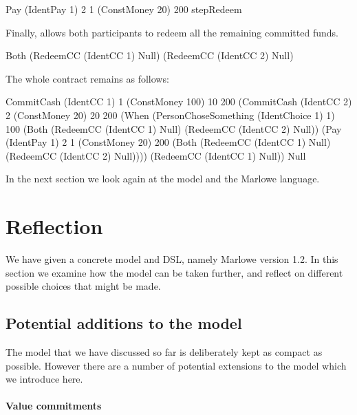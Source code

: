 \documentclass[
      acmsmall
    , screen
    , review=true
  ]{acmart}
\begin{document}
\begin{haskellcode}
Pay (IdentPay 1) 2 1 (ConstMoney 20) 200 stepRedeem
\end{haskellcode}

Finally,  allows both participants to redeem all the remaining committed funds.

\begin{haskellcode}
Both (RedeemCC (IdentCC 1) Null)
     (RedeemCC (IdentCC 2) Null)
\end{haskellcode}

The whole contract remains as follows:
\begin{haskellcode}
CommitCash (IdentCC 1) 1
           (ConstMoney 100)
           10 200
           (CommitCash (IdentCC 2) 2
                       (ConstMoney 20)
                       20 200
                       (When (PersonChoseSomething (IdentChoice 1) 1)
                             100
                             (Both (RedeemCC (IdentCC 1) Null)
                                   (RedeemCC (IdentCC 2) Null))
                             (Pay (IdentPay 1) 2 1
                                  (ConstMoney 20)
                                  200
                                  (Both (RedeemCC (IdentCC 1) Null)
                                        (RedeemCC (IdentCC 2) Null))))
                       (RedeemCC (IdentCC 1) Null))
           Null
\end{haskellcode}
In the next section we look again at the model and the Marlowe language.

\section{Reflection}
We have given a concrete model and DSL, namely Marlowe version 1.2. In this section we examine how the model can be taken further, and reflect on different possible choices that might be made.

\subsection{Potential additions to the model}

The model that we have discussed so far is deliberately kept as compact as possible. However there are a number of potential extensions to the model which we introduce here. 

\paragraph{Value commitments}
\end{document}
